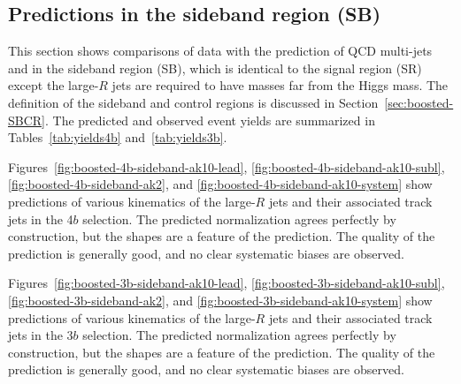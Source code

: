 \subsection{Predictions in the sideband region (SB)}
\label{sec:boosted-sb}

This section shows comparisons of data with the prediction of QCD multi-jets and \ttbar in the sideband region (SB), which is identical to the signal region (SR) except the large-$R$ jets are required to have masses far from the Higgs mass. The definition of the sideband and control regions is discussed in Section~\ref{sec:boosted-SBCR}. The predicted and observed event yields are summarized in Tables~\ref{tab:yields4b} and~\ref{tab:yields3b}.

Figures~\ref{fig:boosted-4b-sideband-ak10-lead}, \ref{fig:boosted-4b-sideband-ak10-subl}, \ref{fig:boosted-4b-sideband-ak2},  and \ref{fig:boosted-4b-sideband-ak10-system} show predictions of various kinematics of the large-$R$ jets and their associated track jets in the 4$b$ selection. The predicted normalization agrees perfectly by construction, but the shapes are a feature of the prediction. The quality of the prediction is generally good, and no clear systematic biases are observed.


Figures~\ref{fig:boosted-3b-sideband-ak10-lead}, \ref{fig:boosted-3b-sideband-ak10-subl}, \ref{fig:boosted-3b-sideband-ak2},  and \ref{fig:boosted-3b-sideband-ak10-system} show predictions of various kinematics of the large-$R$ jets and their associated track jets in the 3$b$ selection. The predicted normalization agrees perfectly by construction, but the shapes are a feature of the prediction. The quality of the prediction is generally good, and no clear systematic biases are observed.


